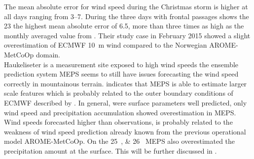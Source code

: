 The mean absolute error for wind speed during the Christmas storm is higher at all days ranging from \SIrange{3}{7}{\mPs}.
During the three days with frontal passages shows the \SI{23}{\dec} the highest mean absolute error of \SI{6.5}{\mPs}, more than three times as high as the monthly averaged value from \citet{muller_arome-metcoop:_2017}. Their study case in February 2015 showed a slight overestimation of ECMWF \SI{10}{\metre} wind compared to the Norwegian AROME-MetCoOp domain. 
\\
Haukeliseter is a measurement site exposed to high wind speeds \citep{wolff_measurements_2013,wolff_derivation_2015} the ensemble prediction system MEPS seems to still have issues forecasting the wind speed correctly in mountainous terrain.
 indicates that MEPS is able to estimate larger scale features which is probably related to the outer boundary conditions of ECMWF described by \citet{dahlgren_comparison_2013}.
In general, were surface parameters well predicted, only wind speed and precipitation accumulation showed overestimation in MEPS. Wind speeds forecasted higher than observations, is probably related to the weakness of wind speed prediction already known from the previous operational model AROME-MetCoOp. On the \SIlist{25;26}{\dec} MEPS also overestimated the precipitation amount at the surface. This will be further discussed in .


